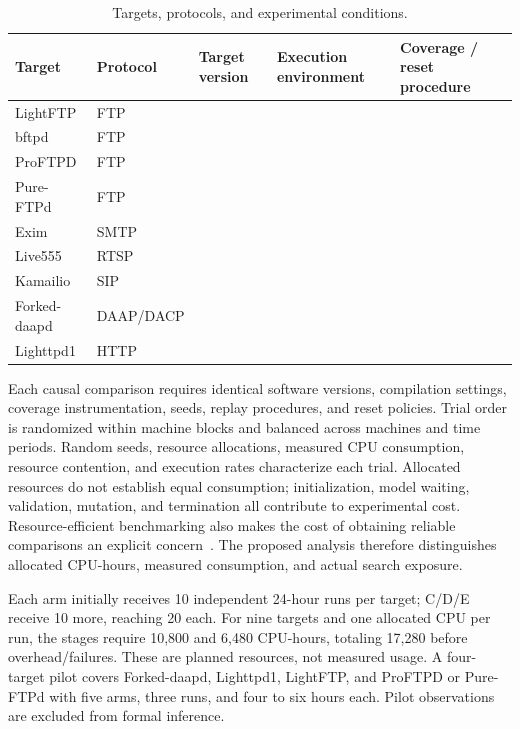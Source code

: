 \documentclass[final,5p,times,number]{elsarticle}
\newcommand{\missing}{\mbox{}}
\begin{document}
\begin{table}[!tbp]
\centering\small
\caption{Targets, protocols, and experimental conditions.}
\label{tab:targets}
\begin{tabularx}{\textwidth}{l l Y Y Y}
\toprule
Target & Protocol & Target version & Execution environment & Coverage / reset procedure \\
\midrule
LightFTP & FTP & \missing & \missing & \missing \\
bftpd & FTP & \missing & \missing & \missing \\
ProFTPD & FTP & \missing & \missing & \missing \\
Pure-FTPd & FTP & \missing & \missing & \missing \\
Exim & SMTP & \missing & \missing & \missing \\
Live555 & RTSP & \missing & \missing & \missing \\
Kamailio & SIP & \missing & \missing & \missing \\
Forked-daapd & DAAP/DACP & \missing & \missing & \missing \\
Lighttpd1 & HTTP & \missing & \missing & \missing \\
\bottomrule
\end{tabularx}
\end{table}

Each causal comparison requires identical software versions, compilation settings, coverage instrumentation, seeds, replay procedures, and reset policies. Trial order is randomized within machine blocks and balanced across machines and time periods. Random seeds, resource allocations, measured CPU consumption, resource contention, and execution rates characterize each trial. Allocated resources do not establish equal consumption; initialization, model waiting, validation, mutation, and termination all contribute to experimental cost. Resource-efficient benchmarking also makes the cost of obtaining reliable comparisons an explicit concern~\cite{greenbenchmark2023}. The proposed analysis therefore distinguishes allocated CPU-hours, measured consumption, and actual search exposure.

Each arm initially receives 10 independent 24-hour runs per target; C/D/E receive 10 more, reaching 20 each. For nine targets and one allocated CPU per run, the stages require 10,800 and 6,480 CPU-hours, totaling 17,280 before overhead/failures. These are planned resources, not measured usage. A four-target pilot covers Forked-daapd, Lighttpd1, LightFTP, and ProFTPD or Pure-FTPd with five arms, three runs, and four to six hours each. Pilot observations are excluded from formal inference.
\end{document}
